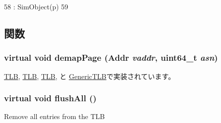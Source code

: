 \begin{DoxyCode}
58         : SimObject(p)
59     {}
\end{DoxyCode}


\subsection{関数}
\hypertarget{classBaseTLB_aff4b9d01b9a4712c699cfb2dd9b3b8cd}{
\subsubsection[{demapPage}]{\setlength{\rightskip}{0pt plus 5cm}virtual void demapPage ({\bf Addr} {\em vaddr}, \/  uint64\_\-t {\em asn})}}
\label{classBaseTLB_aff4b9d01b9a4712c699cfb2dd9b3b8cd}


\hyperlink{classPowerISA_1_1TLB_a2d698ff909513b48a1263f8a5440e067}{TLB}, \hyperlink{classSparcISA_1_1TLB_a2d698ff909513b48a1263f8a5440e067}{TLB}, \hyperlink{classX86ISA_1_1TLB_a18477caae4a9699b99ee4f1ebca75c31}{TLB}, と \hyperlink{classGenericTLB_a2d698ff909513b48a1263f8a5440e067}{GenericTLB}で実装されています。\hypertarget{classBaseTLB_a5958bc92949a47d1be1088468abdc006}{
\subsubsection[{flushAll}]{\setlength{\rightskip}{0pt plus 5cm}virtual void flushAll ()}}
\label{classBaseTLB_a5958bc92949a47d1be1088468abdc006}
Remove all entries from the TLB 

